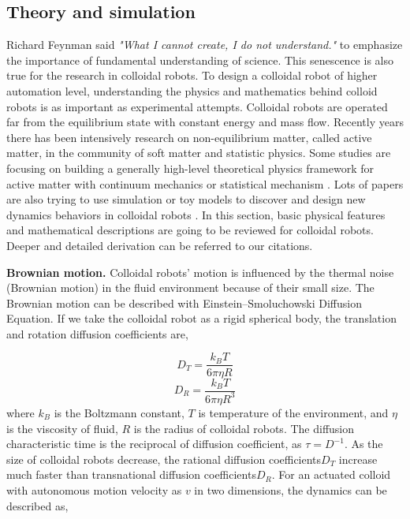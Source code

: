 \subsection{Theory and simulation}
Richard Feynman said \textit{"What I cannot create, I do not understand."} to emphasize the importance of fundamental understanding of science. This senescence is also true for the  research in colloidal robots. To design a colloidal robot of higher automation level, understanding the physics and mathematics behind colloid robots is as  important as  experimental attempts. Colloidal robots are operated far from the equilibrium state with constant energy and mass flow. Recently years there has been intensively research on non-equilibrium matter, called active matter, in the community of soft matter and statistic physics. Some studies are focusing on building a generally high-level theoretical physics framework for active matter with continuum mechanics or statistical mechanism \autocite{stenhammar2013continuum,solon2015pressure,fodor2016far}. Lots of papers are also trying to use simulation or toy models to discover and design new dynamics behaviors in colloidal robots \autocite{bechinger2016active,speck2014effective,ten2011brownian}. In this section,  basic physical features and mathematical descriptions are going to be reviewed for colloidal robots.  Deeper and detailed derivation can be referred to our citations.

\textbf{Brownian motion.} Colloidal robots' motion is influenced by the thermal noise (Brownian motion) in the fluid environment because of their small size. The Brownian motion can be described with Einstein–Smoluchowski Diffusion Equation\autocite{islam2004einstein}. If we take the colloidal robot as  a rigid spherical body, the translation and rotation diffusion coefficients are,

\begin{equation}
    D_T=\frac{k_B T}{6 \pi \eta R }
\end{equation}
\begin{equation}
    D_R=\frac{k_B T}{6 \pi \eta R^3 }
\end{equation}
where $k_B$ is the Boltzmann constant, $T$ is temperature of the environment, and $\eta$ is the viscosity of fluid, $R$ is the radius of colloidal robots. The diffusion characteristic time is the 
reciprocal of diffusion coefficient, as  $\tau=D^{-1}$. As the size of colloidal robots decrease, the rational diffusion coefficients$D_T$ increase much faster than transnational diffusion coefficients$D_R$. For an actuated colloid with autonomous motion velocity as $v$ in two dimensions, the dynamics can be described as,


